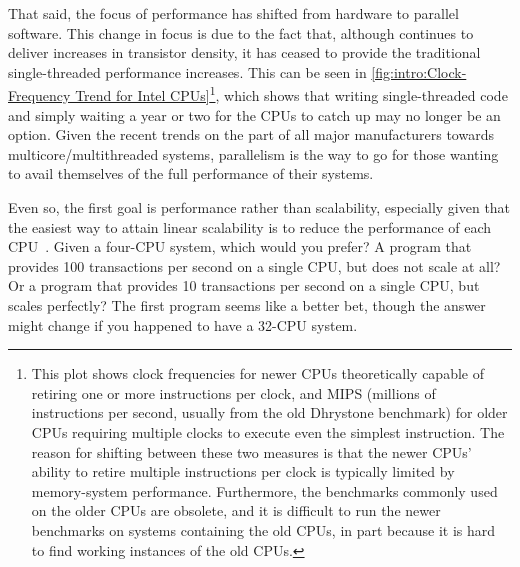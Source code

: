 That said, the focus of performance has shifted from hardware to
parallel software.
This change in focus is due to the fact that, although 
continues to deliver increases in transistor density, it has ceased to
provide the traditional single-threaded performance increases.
This can be seen in
\cref{fig:intro:Clock-Frequency Trend for Intel CPUs}\footnote{
	This plot shows clock frequencies for newer CPUs theoretically
	capable of retiring one or more instructions per clock, and MIPS
	(millions of instructions per second, usually from the old
	Dhrystone benchmark)
	for older CPUs requiring multiple clocks to execute even the
	simplest instruction.
	The reason for shifting between these two measures is that the
	newer CPUs' ability to retire multiple instructions per clock is
	typically limited by memory-system performance.
	Furthermore, the benchmarks commonly used on the older CPUs
	are obsolete, and it is difficult to run the newer benchmarks
	on systems containing the old CPUs, in part because it is hard
	to find working instances of the old CPUs.},
which shows that writing single-threaded code and simply waiting
a year or two for the CPUs to catch up may no longer be an option.
Given the recent trends on the part of all major manufacturers towards
multicore/multithreaded systems, parallelism is the way to go for
those wanting to avail themselves of the full performance of their
systems.

\QuickQuizEnd

Even so, the first goal is performance rather than scalability,
especially given that the easiest way to attain linear scalability
is to reduce the performance of each CPU~\cite{LinusTorvalds2001a}.
Given a four-CPU system, which would you prefer?
A program that provides 100 transactions per second on a single CPU,
but does not scale at all?
Or a program that provides 10 transactions per second on a single CPU,
but scales perfectly?
The first program seems like a better bet, though the answer might
change if you happened to have a 32-CPU system.

